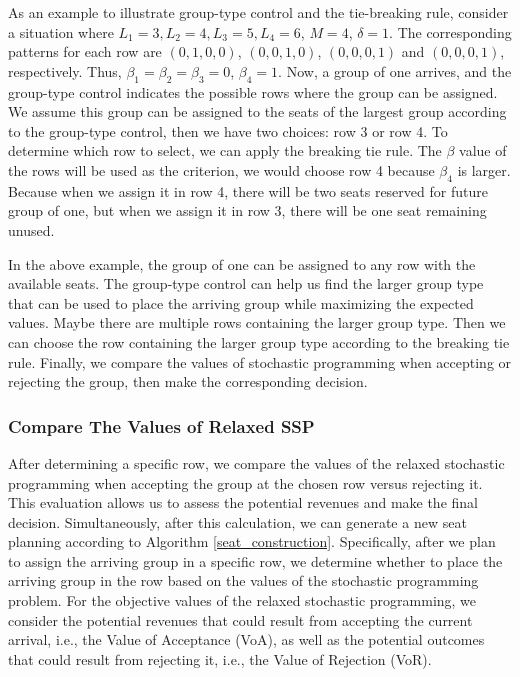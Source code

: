 As an example to illustrate group-type control and the tie-breaking rule, consider a situation where $L_1 =3, L_2 = 4, L_3 =5, L_4 =6$, $M =4$, $\delta =1$. The corresponding patterns for each row are $(0,1,0,0)$, $(0,0,1,0)$, $(0,0,0,1)$ and $(0,0,0,1)$, respectively. Thus, $\beta_1 = \beta_2 = \beta_3 =0$, $\beta_4 =1$. Now, a group of one arrives, and the group-type control indicates the possible rows where the group can be assigned. We assume this group can be assigned to the seats of the largest group according to the group-type control, then we have two choices: row 3 or row 4. To determine which row to select, we can apply the breaking tie rule. The $\beta$ value of the rows will be used as the criterion, we would choose row 4 because $\beta_4$ is larger. Because when we assign it in row 4, there will be two seats reserved for future group of one, but when we assign it in row 3, there will be one seat remaining unused.

In the above example, the group of one can be assigned to any row with the available seats. The group-type control can help us find the larger group type that can be used to place the arriving group while maximizing the expected values. Maybe there are multiple rows containing the larger group type. Then we can choose the row containing the larger group type according to the breaking tie rule. 
Finally, we compare the values of stochastic programming when accepting or rejecting the group, then make the corresponding decision.



\subsubsection{Compare The Values of Relaxed SSP}
After determining a specific row, we compare the values of the relaxed stochastic programming when accepting the group at the chosen row versus rejecting it. This evaluation allows us to assess the potential revenues and make the final decision. Simultaneously, after this calculation, we can generate a new seat planning according to Algorithm \ref{seat_construction}. Specifically, after we plan to assign the arriving group in a specific row, we determine whether to place the arriving group in the row based on the values of the stochastic programming problem. For the objective values of the relaxed stochastic programming, we consider the potential revenues that could result from accepting the current arrival, i.e., the Value of Acceptance (VoA), as well as the potential outcomes that could result from rejecting it, i.e., the Value of Rejection (VoR).

